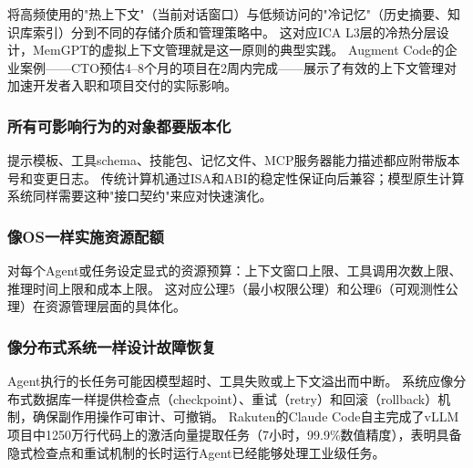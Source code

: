 将高频使用的"热上下文"（当前对话窗口）与低频访问的"冷记忆"（历史摘要、知识库索引）分到不同的存储介质和管理策略中。
这对应ICA L3层的冷热分层设计，MemGPT的虚拟上下文管理就是这一原则的典型实践\cite{memgpt2023}。
Augment Code的企业案例——CTO预估4--8个月的项目在2周内完成\cite{anthropic2026agenticreport}——展示了有效的上下文管理对加速开发者入职和项目交付的实际影响。

\subsubsection{所有可影响行为的对象都要版本化}

提示模板、工具schema、技能包、记忆文件、MCP服务器能力描述都应附带版本号和变更日志\cite{mcp_intro_2026,agentprotocols2025}。
传统计算机通过ISA和ABI的稳定性保证向后兼容；模型原生计算系统同样需要这种"接口契约"来应对快速演化。

\subsubsection{像OS一样实施资源配额}

对每个Agent或任务设定显式的资源预算：上下文窗口上限、工具调用次数上限、推理时间上限和成本上限\cite{linux_cgroup_2026}。
这对应公理5（最小权限公理）和公理6（可观测性公理）在资源管理层面的具体化。

\subsubsection{像分布式系统一样设计故障恢复}

Agent执行的长任务可能因模型超时、工具失败或上下文溢出而中断。
系统应像分布式数据库一样提供检查点（checkpoint）、重试（retry）和回滚（rollback）机制，确保副作用操作可审计、可撤销\cite{raft2014,spanner2012}。
Rakuten的Claude Code自主完成了vLLM项目中1250万行代码上的激活向量提取任务（7小时，99.9\%数值精度）\cite{anthropic2026agenticreport}，表明具备隐式检查点和重试机制的长时运行Agent已经能够处理工业级任务。

